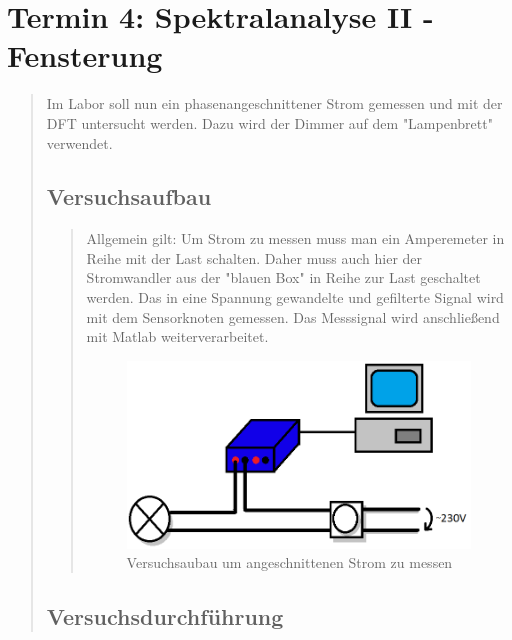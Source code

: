 \section{Termin 4: Spektralanalyse II - Fensterung}
\begin{quote}

	Im Labor soll nun ein phasenangeschnittener Strom gemessen und mit der DFT untersucht werden.
	Dazu wird der Dimmer auf dem "Lampenbrett" verwendet.
	
	\subsection{Versuchsaufbau}
	\begin{quote}
	Allgemein gilt: Um Strom zu messen muss man ein Amperemeter in Reihe mit der Last schalten. 
	Daher muss auch hier der Stromwandler aus der "blauen Box" in Reihe zur Last geschaltet 
	werden. Das in eine Spannung gewandelte und gefilterte Signal wird mit dem Sensorknoten gemessen. 
	Das Messsignal wird anschließend mit Matlab weiterverarbeitet.

	\begin{figure}[htb]
	\centering
	\includegraphics[scale=0.7, width=1\textwidth]{./Bilder/Versuchsaufbau1}
	\caption{Versuchsaubau um angeschnittenen Strom zu messen}
	\end{figure}
	
	\end{quote}
		
	\subsection{Versuchsdurchführung}
	\begin{quote}
		

\end{quote}
\end{quote}
